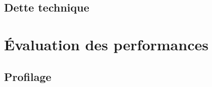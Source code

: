\documentclass[10pt]{report}
\begin{document}
	\subsection{Dette technique}
	
	
	
	
	
	\section{Évaluation des performances}
		\subsection{Profilage}
	
\end{document}
